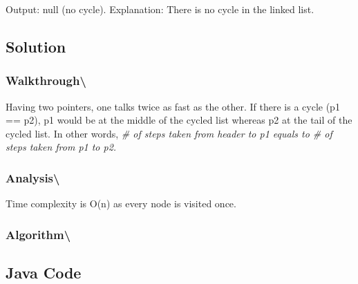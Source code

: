 \documentclass[]{book}
\begin{document}
Output: null (no cycle). Explanation: There is no cycle in the linked list.

\hypertarget{solution-63}{%
\subsection{Solution}\label{solution-63}}

\hypertarget{walkthrough-106}{%
\subsubsection{Walkthrough\textbackslash{}}\label{walkthrough-106}}

Having two pointers, one talks twice as fast as the other. If there is a cycle (p1 == p2), p1 would be at
the middle of the cycled list whereas p2 at the tail of the cycled list. In other words, \emph{\# of steps
taken from header to p1 equals to \# of steps taken from p1 to p2.}

\hypertarget{analysis-113}{%
\subsubsection{Analysis\textbackslash{}}\label{analysis-113}}

Time complexity is O(n) as every node is visited once.

\hypertarget{algorithm-119}{%
\subsubsection{Algorithm\textbackslash{}}\label{algorithm-119}}

\hypertarget{java-code-70}{%
\subsection{Java Code}\label{java-code-70}}
\end{document}

